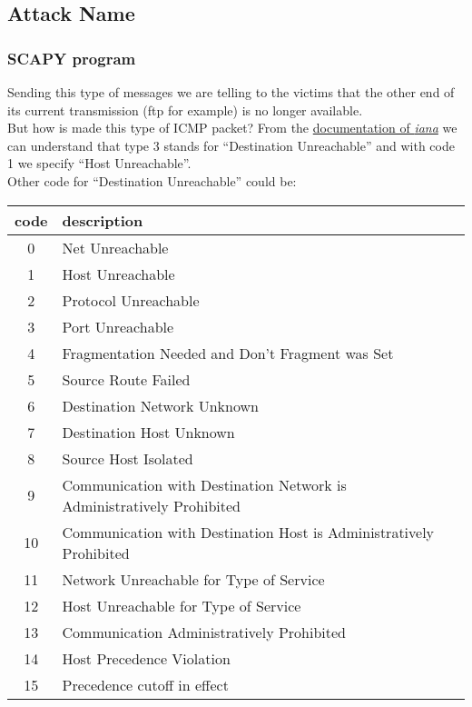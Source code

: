 \subsection{Attack Name}
\subsubsection{SCAPY program}

Sending this type of messages we are telling to the victims that the other end of its current transmission (ftp for example) is no longer available.\\
But how is made this type of ICMP packet? From the \href{https://www.iana.org/assignments/icmp-parameters/icmp-parameters.xhtml}{documentation of \textit{iana}} we can understand that type 3 stands for “Destination Unreachable” and with code 1 we specify “Host Unreachable”.\\
Other code for “Destination Unreachable” could be:\par
\medskip
\begin{tabular}{|c|l|}
  \hline
  \textbf{code} & \textbf{description} \\
  \hline
  0 & Net Unreachable \\
  1 & Host Unreachable \\
  2 & Protocol Unreachable \\
  3 & Port Unreachable \\
  4 & Fragmentation Needed and Don't Fragment was Set \\
  5 & Source Route Failed \\
  6 & Destination Network Unknown \\
  7 & Destination Host Unknown \\
  8 & Source Host Isolated \\
  9 & Communication with Destination Network is Administratively Prohibited \\
  10 & Communication with Destination Host is Administratively Prohibited \\
  11 & Network Unreachable for Type of Service \\
  12 & Host Unreachable for Type of Service \\
  13 & Communication Administratively Prohibited \\
  14 & Host Precedence Violation \\
  15 & Precedence cutoff in effect \\
  \hline
\end{tabular}


